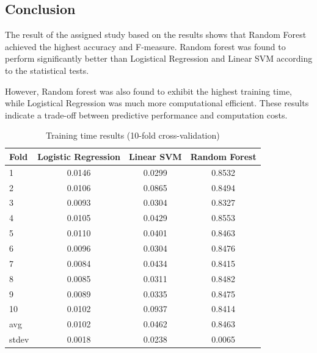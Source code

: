 \documentclass[conference]{IEEEtran}
\begin{document}
\subsection{Conclusion}


The result of the assigned study based on the results shows that Random Forest achieved the highest accuracy and F-measure. 
Random forest was found to perform significantly better than Logistical Regression and Linear SVM according to the statistical tests. 

However, Random forest was also found to exhibit the highest training time, while Logistical Regression was much more computational efficient. 
These results indicate a trade-off between predictive performance and computation costs.

\begin{table}[t]
\centering
\caption{Training time results (10-fold cross-validation)}
\label{tab:time}
\begin{tabular}{@{}lccc@{}}
\toprule
Fold & Logistic Regression & Linear SVM & Random Forest \\
\midrule
1  & 0.0146 & 0.0299 & 0.8532 \\
2  & 0.0106 & 0.0865 & 0.8494 \\
3  & 0.0093 & 0.0304 & 0.8327 \\
4  & 0.0105 & 0.0429 & 0.8553 \\
5  & 0.0110 & 0.0401 & 0.8463 \\
6  & 0.0096 & 0.0304 & 0.8476 \\
7  & 0.0084 & 0.0434 & 0.8415 \\
8  & 0.0085 & 0.0311 & 0.8482 \\
9  & 0.0089 & 0.0335 & 0.8475 \\
10 & 0.0102 & 0.0937 & 0.8414 \\
avg   & 0.0102 & 0.0462 & 0.8463 \\
stdev & 0.0018 & 0.0238 & 0.0065 \\
\bottomrule
\end{tabular}
\end{table}
\end{document}
